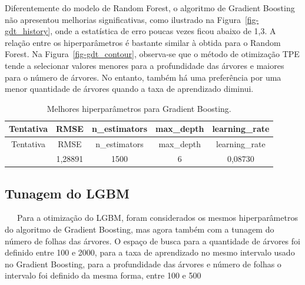 \documentclass[
  12pt,
  a4paper,
]{scrreprt}
\begin{document}
Diferentemente do modelo de Random Forest, o algoritmo de Gradient
Boosting não apresentou melhorias significativas, como ilustrado na
Figura~\ref{fig-gdt_history}, onde a estatística de erro poucas vezes
ficou abaixo de 1,3. A relação entre os hiperparâmetros é bastante
similar à obtida para o Random Forest. Na Figura~\ref{fig-gdt_contour},
observa-se que o método de otimização TPE tende a selecionar valores
menores para a profundidade das árvores e maiores para o número de
árvores. No entanto, também há uma preferência por uma menor quantidade
de árvores quando a taxa de aprendizado diminui.

\begin{longtable}[]{@{}ccccc@{}}
\caption{Melhores hiperparâmetros para Gradient
Boosting.}\label{tbl-params_gdt}\tabularnewline
\toprule\noalign{}
Tentativa & RMSE & n\_estimators & max\_depth & learning\_rate \\
\midrule\noalign{}
\endfirsthead
\toprule\noalign{}
Tentativa & RMSE & n\_estimators & max\_depth & learning\_rate \\
\midrule\noalign{}
\endhead
\bottomrule\noalign{}
\endlastfoot
50 & 1,28891 & 1500 & 6 & 0,08730 \\
\end{longtable}

\subsection{Tunagem do LGBM}\label{tunagem-do-lgbm}

~~~Para a otimização do LGBM, foram considerados os mesmos
hiperparâmetros do algoritmo de Gradient Boosting, mas agora também com
a tunagem do número de folhas das árvores. O espaço de busca para a
quantidade de árvores foi definido entre 100 e 2000, para a taxa de
aprendizado no mesmo intervalo usado no Gradient Boosting, para a
profundidade das árvores e número de folhas o intervalo foi definido da
mesma forma, entre 100 e 500
\end{document}
